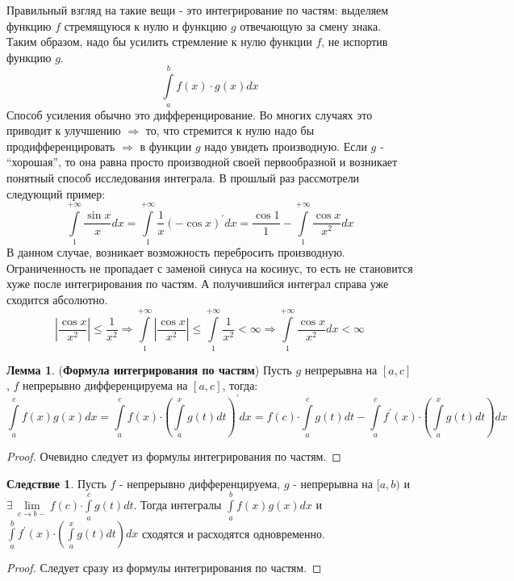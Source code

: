 \documentclass[12pt]{article}
\theoremstyle{definition}
\newtheorem{lemma}{Лемма}
\newtheorem{corollary}{Следствие}
\newcommand{\ddint}[2]{\displaystyle\int\limits_{#1}^{#2}}
\begin{document}
Правильный взгляд на такие вещи - это интегрирование по частям: выделяем функцию $f$ стремящуюся к нулю и функцию $g$ отвечающую за смену знака. Таким образом, надо бы усилить стремление к нулю функции $f$, не испортив функцию $g$.
$$
	\ddint{a}{b}f(x){\cdot}g(x)dx
$$
Способ усиления обычно это дифференцирование. Во многих случаях это приводит к улучшению $\Rightarrow$ то, что стремится к нулю надо бы продифференцировать $\Rightarrow$ в функции $g$ надо увидеть производную. Если $g$ - ``хорошая'', то она равна просто производной своей первообразной и возникает понятный способ исследования интеграла. В прошлый раз рассмотрели следующий пример:
$$
	\ddint{1}{+\infty}\dfrac{\sin{x}}{x}dx = \ddint{1}{+\infty}\dfrac{1}{x}(-\cos{x})^\prime dx = \dfrac{\cos{1}}{1} - \ddint{1}{+\infty}\dfrac{\cos{x}}{x^2}dx
$$
В данном случае, возникает возможность перебросить производную. Ограниченность не пропадает с заменой синуса на косинус, то есть не становится хуже после интегрирования  по частям. А получившийся интеграл справа уже сходится абсолютно.
$$
	\left|\dfrac{\cos{x}}{x^2}\right| \leq \dfrac{1}{x^2} \Rightarrow \ddint{1}{+\infty}\left|\dfrac{\cos{x}}{x^2}\right| \leq \ddint{1}{+\infty}\dfrac{1}{x^2} < \infty \Rightarrow \ddint{1}{+\infty}\dfrac{\cos{x}}{x^2}dx < \infty
$$
\begin{lemma}(\textbf{Формула интегрирования по частям})
	Пусть $g$ непрерывна на $[a,c]$, $f$ непрерывно дифференцируема на $[a,c]$, тогда:
	$$
		\ddint{a}{c}f(x)g(x)dx = \ddint{a}{c}f(x){\cdot\!\!}\left(\ddint{a}{x}g(t)dt\right)^\prime dx = f(c){\cdot\!\!}\ddint{a}{c}g(t)dt - \ddint{a}{c}f^\prime(x){\cdot\!\!}\left(\ddint{a}{x}g(t)dt\right)dx
	$$
\end{lemma}
\begin{proof}
	Очевидно следует из формулы интегрирования по частям.
\end{proof}

\begin{corollary}
	Пусть $f$ - непрерывно дифференцируема, $g$ - непрерывна на $[a,b)$ и $\exists \, \lim\limits_{c \to b-}f(c){\cdot\!\!}\ddint{a}{c}g(t)dt$. Тогда интегралы $\ddint{a}{b}f(x)g(x)dx$ и $\ddint{a}{b}f^\prime(x){\cdot\!\!}\left(\ddint{a}{x}g(t)dt\right)dx$ сходятся и расходятся одновременно.
\end{corollary}
\begin{proof}
	Следует сразу из формулы интегрирования по частям.
\end{proof}
\end{document}
